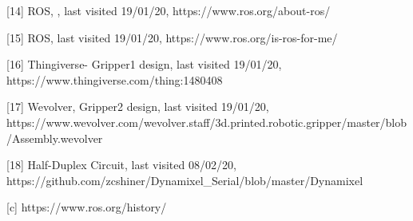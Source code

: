 \documentclass{l4proj}
\begin{document}
[14] ROS, , last visited 19/01/20, https://www.ros.org/about-ros/

[15] ROS, last visited 19/01/20, https://www.ros.org/is-ros-for-me/

[16] Thingiverse- Gripper1 design, last visited 19/01/20, https://www.thingiverse.com/thing:1480408

[17] Wevolver, Gripper2 design, last visited 19/01/20, https://www.wevolver.com/wevolver.staff/3d.printed.robotic.gripper/master/blob/Assembly.wevolver

[18] Half-Duplex Circuit, last visited 08/02/20, https://github.com/zcshiner/Dynamixel_Serial/blob/master/Dynamixel%

[c] https://www.ros.org/history/
\end{document}
